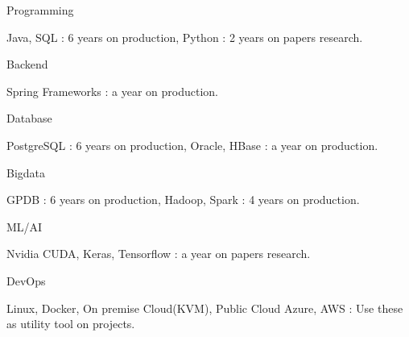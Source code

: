 

\begin{cvskills}

  \cvskill
    {Programming}
    {
      \begin{skillitems}
        \item {Java, SQL : 6 years on production, Python : 2 years on papers research.}
      \end{skillitems}
    }

  \cvskill
    {Backend}
    {
      \begin{skillitems}
        \item {Spring Frameworks : a year on production.}
      \end{skillitems}
    }

  \cvskill
    {Database}
    {
      \begin{skillitems}
        \item {PostgreSQL : 6 years on production, Oracle, HBase : a year on production.}
      \end{skillitems}
    }

  \cvskill
    {Bigdata}
    {
      \begin{skillitems}
        \item {GPDB : 6 years on production, Hadoop, Spark : 4 years on production.}
      \end{skillitems}
    }

  \cvskill
    {ML/AI}
    {
      \begin{skillitems}
        \item {Nvidia CUDA, Keras, Tensorflow : a year on papers research.}
      \end{skillitems}
    }

  \cvskill
    {DevOps} %
    {
      \begin{skillitems}
      \item {Linux, Docker, On premise Cloud(KVM), Public Cloud Azure, AWS : Use these as utility tool on projects.}
      \end{skillitems}
    }


\end{cvskills}
